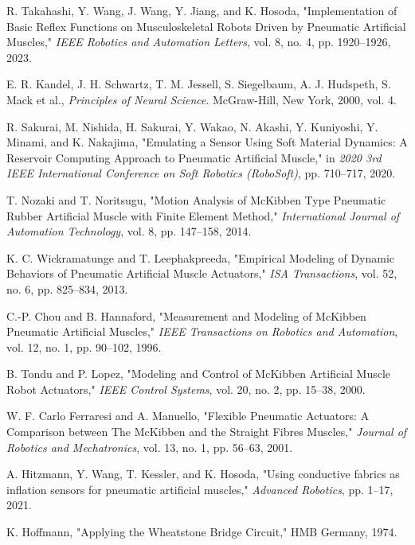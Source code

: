 \documentclass[letterpaper, 10 pt, conference]{IEEEconf}
\begin{document}
\begin{thebibliography}{99}
     R. Takahashi, Y. Wang, J. Wang, Y. Jiang, and K. Hosoda, "Implementation of Basic Reflex Functions on Musculoskeletal Robots Driven by Pneumatic Artificial Muscles," \textit{IEEE Robotics and Automation Letters}, vol. 8, no. 4, pp. 1920--1926, 2023.
    
     E. R. Kandel, J. H. Schwartz, T. M. Jessell, S. Siegelbaum, A. J. Hudspeth, S. Mack et al., \textit{Principles of Neural Science}. McGraw-Hill, New York, 2000, vol. 4.
    
     R. Sakurai, M. Nishida, H. Sakurai, Y. Wakao, N. Akashi, Y. Kuniyoshi, Y. Minami, and K. Nakajima, "Emulating a Sensor Using Soft Material Dynamics: A Reservoir Computing Approach to Pneumatic Artificial Muscle," in \textit{2020 3rd IEEE International Conference on Soft Robotics (RoboSoft)}, pp. 710--717, 2020.
    
     T. Nozaki and T. Noritsugu, "Motion Analysis of McKibben Type Pneumatic Rubber Artificial Muscle with Finite Element Method," \textit{International Journal of Automation Technology}, vol. 8, pp. 147--158, 2014.
    
     K. C. Wickramatunge and T. Leephakpreeda, "Empirical Modeling of Dynamic Behaviors of Pneumatic Artificial Muscle Actuators," \textit{ISA Transactions}, vol. 52, no. 6, pp. 825--834, 2013.
    
     C.-P. Chou and B. Hannaford, "Measurement and Modeling of McKibben Pneumatic Artificial Muscles," \textit{IEEE Transactions on Robotics and Automation}, vol. 12, no. 1, pp. 90--102, 1996.
    
     B. Tondu and P. Lopez, "Modeling and Control of McKibben Artificial Muscle Robot Actuators," \textit{IEEE Control Systems}, vol. 20, no. 2, pp. 15--38, 2000.
    
     W. F. Carlo Ferraresi and A. Manuello, "Flexible Pneumatic Actuators: A Comparison between The McKibben and the Straight Fibres Muscles," \textit{Journal of Robotics and Mechatronics}, vol. 13, no. 1, pp. 56--63, 2001.

     A. Hitzmann, Y. Wang, T. Kessler, and K. Hosoda, "Using conductive fabrics as inflation sensors for pneumatic artificial muscles," \textit{Advanced Robotics}, pp. 1--17, 2021.


     K. Hoffmann, "Applying the Wheatstone Bridge Circuit," HMB Germany, 1974.

  
    
    \end{thebibliography}
    

    
\end{document}
